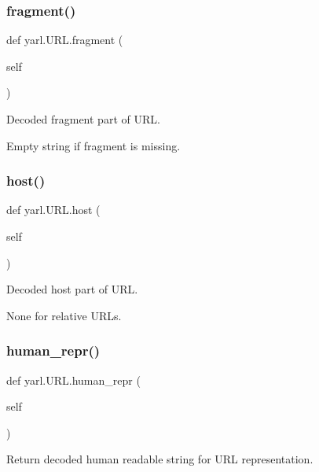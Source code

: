 \subsubsection{\texorpdfstring{fragment()}{fragment()}}
{\footnotesize\ttfamily def yarl.\+U\+R\+L.\+fragment (\begin{DoxyParamCaption}\item[{}]{self }\end{DoxyParamCaption})}

\begin{DoxyVerb}Decoded fragment part of URL.

Empty string if fragment is missing.\end{DoxyVerb}
 \mbox{\label{classyarl_1_1_u_r_l_ae650199d67e0c5092c25b22c14caed54}} 
\subsubsection{\texorpdfstring{host()}{host()}}
{\footnotesize\ttfamily def yarl.\+U\+R\+L.\+host (\begin{DoxyParamCaption}\item[{}]{self }\end{DoxyParamCaption})}

\begin{DoxyVerb}Decoded host part of URL.

None for relative URLs.\end{DoxyVerb}
 \mbox{\label{classyarl_1_1_u_r_l_ab633c320e7030c9b6461241151ad3a7a}} 
\subsubsection{\texorpdfstring{human\+\_\+repr()}{human\_repr()}}
{\footnotesize\ttfamily def yarl.\+U\+R\+L.\+human\+\_\+repr (\begin{DoxyParamCaption}\item[{}]{self }\end{DoxyParamCaption})}

\begin{DoxyVerb}Return decoded human readable string for URL representation.\end{DoxyVerb}
 \mbox{\label{classyarl_1_1_u_r_l_a3144222292c0fd1f9b87cab458909eb2}} 
